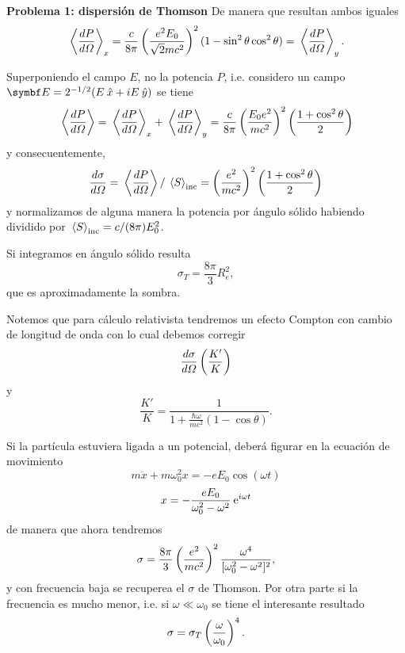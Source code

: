 \documentclass[10pt,oneside]{CBFT_book}
\begin{document}
\begin{ejemplo}{\bf Problema 1: dispersión de Thomson}
De manera que resultan ambos iguales
\[
	\:\left\langle \frac{d^{\hspace{-0.05em}} {P}}{d {\Omega}^{\hspace{-0.05em}}} \right\rangle_x = \frac{c}{8\pi}\left( \frac{  e^2 E_0 }{  \sqrt{2} m c^2  } \right)^2 
	( 1 - \sin^2\theta \cos^2\theta ) = \:\left\langle \frac{d^{\hspace{-0.05em}} {P}}{d {\Omega}^{\hspace{-0.05em}}} \right\rangle_y.
\]

Superponiendo el campo $E$, no la potencia $P$, i.e. considero un campo $ \vb{E} = 2^{-1/2}
( E\xver + i E \yver ) $ se tiene 
\[
	\:\left\langle \frac{d^{\hspace{-0.05em}} {P}}{d {\Omega}^{\hspace{-0.05em}}} \right\rangle = \:\left\langle \frac{d^{\hspace{-0.05em}} {P}}{d {\Omega}^{\hspace{-0.05em}}} \right\rangle_x + \:\left\langle \frac{d^{\hspace{-0.05em}} {P}}{d {\Omega}^{\hspace{-0.05em}}} \right\rangle_y =
	\frac{c}{8\pi} \left( \frac{ E_0e^2 }{ mc^2 } \right)^2 \left( \frac{ 1+\cos^2\theta }{ 2 } \right)
\]
y consecuentemente,
\[
	\frac{d^{\hspace{-0.05em}} {\sigma}}{d {\Omega}^{\hspace{-0.05em}}} = \:\left\langle \frac{d^{\hspace{-0.05em}} {P}}{d {\Omega}^{\hspace{-0.05em}}} \right\rangle / \:\left\langle S \right\rangle_\text{inc} =
	\left( \frac{ e^2 }{ mc^2 } \right)^2 \left( \frac{ 1+\cos^2\theta }{ 2 } \right)
\]
y normalizamos de alguna manera la potencia por ángulo sólido habiendo dividido por 
$ \:\left\langle S \right\rangle_\text{inc} = c/(8\pi) E_0^2$.

Si integramos en ángulo sólido resulta
\[
	\sigma_T = \frac{8\pi}{3}R^2_e,
\]
que es aproximadamente la sombra.

Notemos que para cálculo relativista tendremos un efecto Compton con cambio de longitud de onda
con lo cual debemos corregir 
\[
	\frac{d^{\hspace{-0.05em}} {\sigma}}{d {\Omega}^{\hspace{-0.05em}}}\left( \frac{ K' }{ K } \right)
\]
y
\[
	\frac{K'}{K} = \frac{1}{\displaystyle 1 + \frac{\hbar\omega}{mc^2}(1-\cos\theta)}.
\]

Si la partícula estuviera ligada a un potencial, deberá figurar en la ecuación de movimiento
\[
	m\ddot{x} + m \omega_0^2x = -e E_0 \cos(\omega t)
\]
\[
	x = - \frac{e E_0}{\omega_0^2 - \omega^2} \:\mathrm{e}^{i\omega t}
\]
de manera que ahora tendremos
\[
	\sigma = \frac{8\pi}{3}\left( \frac{ e^2 }{ mc^2 } \right)^2 \frac{\omega^4}{[\omega_0^2 - \omega^2]^2},
\]
y con frecuencia baja se recuperea el $\sigma$ de Thomson. Por otra parte si la frecuencia
es mucho menor, i.e. si $\omega \ll \omega_0$ se tiene el interesante resultado
\[
	\sigma = \sigma_T \left( \frac{ \omega }{ \omega_0 } \right)^4.
\]

\end{ejemplo}

\end{document}
